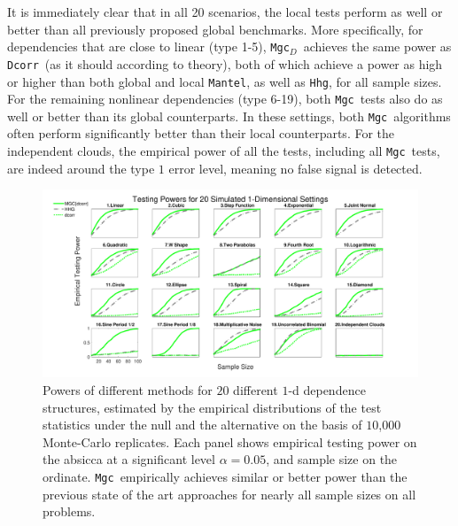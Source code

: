 \documentclass[11pt]{article}
\providecommand{\sct}[1]{{\sc \texttt{#1}}}
\newcommand{\Mgc}{\sct{Mgc}}
\newcommand{\Mgcd}{\sct{Mgc$_D$}}
\newcommand{\Hhg}{\sct{Hhg}}
\newcommand{\Dcorr}{\sct{Dcorr}}
\newcommand{\Mcorr}{\sct{Mcorr}}
\newcommand{\Mantel}{\sct{Mantel}}
\begin{document}
It is immediately clear that in all 20 scenarios, the local tests perform as well or better than all previously proposed global benchmarks.  
More specifically, for dependencies that are close to linear (type 1-5), \Mgcd~achieves the same power as \Dcorr~(as it should according to theory), both of which achieve a power as high or higher than both global and local \Mantel, as well as \Hhg, for all sample sizes.  
For the remaining nonlinear dependencies (type 6-19), both \Mgc~tests also do as well or better than its global counterparts.  In these settings, both \Mgc~algorithms often perform significantly better than their local counterparts.
For the independent clouds,  the empirical power of all the tests, including all \Mgc~tests, are indeed around the type $1$ error level, meaning no false signal is detected. 


\begin{figure}[htbp]
\includegraphics[width=1.0\textwidth]{Figures/Fig1DPower}
\caption{
Powers of different methods for $20$ different $1$-d dependence structures, estimated by the empirical distributions of the test statistics under the null and the alternative on the basis of $10$,$000$ Monte-Carlo replicates.
Each panel shows empirical testing power on the absicca at a significant level $\alpha=0.05$, and sample size on the ordinate.
\Mgc~empirically achieves similar or better power than the previous state of the art approaches for nearly all sample sizes on all problems.}
\label{f:1D}
\end{figure}
\end{document}
